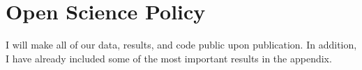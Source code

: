 \clearpage


\section*{Open Science Policy}

I will make all of our data, results, and code public upon
publication. In addition, I have already included some of the most
important results in the appendix.


